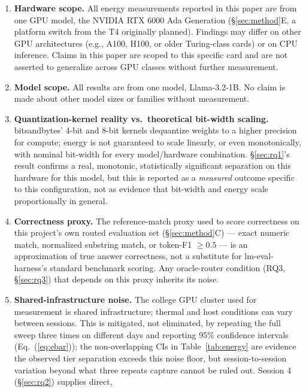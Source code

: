 \documentclass[conference]{IEEEtran}
\begin{document}
\begin{enumerate}
  \item \textbf{Hardware scope.} All energy measurements reported in
    this paper are from one GPU model, the NVIDIA RTX 6000 Ada
    Generation (\S\ref{sec:method}E, a platform switch from the T4
    originally planned). Findings may differ on other GPU architectures
    (e.g., A100, H100, or older Turing-class cards) or on CPU inference.
    Claims in this paper are scoped to this specific card and are not
    asserted to generalize across GPU classes without further
    measurement.
  \item \textbf{Model scope.} All results are from one model,
    Llama-3.2-1B. No claim is made about other model sizes or families
    without measurement.
  \item \textbf{Quantization-kernel reality vs.\ theoretical bit-width
    scaling.} bitsandbytes' 4-bit and 8-bit kernels dequantize weights
    to a higher precision for compute; energy is not guaranteed to
    scale linearly, or even monotonically, with nominal bit-width for
    every model/hardware combination. \S\ref{sec:rq1}'s result confirms
    a real, monotonic, statistically significant separation on this
    hardware for this model, but this is reported as a \emph{measured}
    outcome specific to this configuration, not as evidence that
    bit-width and energy scale proportionally in general.
  \item \textbf{Correctness proxy.} The reference-match proxy used to
    score correctness on this project's own routed evaluation set
    (\S\ref{sec:method}C) --- exact numeric match, normalized substring
    match, or token-F1 $\ge 0.5$ --- is an approximation of true answer
    correctness, not a substitute for lm-eval-harness's standard
    benchmark scoring. Any oracle-router condition (RQ3,
    \S\ref{sec:rq3}) that depends on this proxy inherits its noise.
  \item \textbf{Shared-infrastructure noise.} The college GPU cluster
    used for measurement is shared infrastructure; thermal and host
    conditions can vary between sessions. This is mitigated, not
    eliminated, by repeating the full sweep three times on different
    days and reporting 95\% confidence intervals (Eq.~(\ref{eq:ebar}));
    the non-overlapping CIs in Table~\ref{tab:energy} are evidence the
    observed tier separation exceeds this noise floor, but
    session-to-session variation beyond what three repeats capture
    cannot be ruled out. Session 4 (\S\ref{sec:rq2}) supplies direct,

\end{enumerate}
\end{document}
